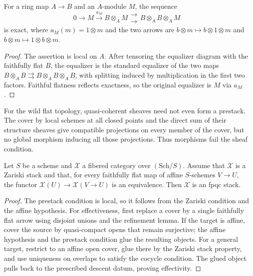 \begin{lemma}\label{fga-lem-4-22}
For a ring map $A\to B$ and an $A$-module $M$, the sequence
\[
0\longrightarrow M\xrightarrow{a_M}B\otimes_A M
 \mathrel{\substack{\longrightarrow\\[-.6ex]\longrightarrow}}
B\otimes_A B\otimes_A M\tag{4.22.1}
\]
is exact, where $a_M(m)=1\otimes m$ and the two arrows are
$b\otimes m\mapsto b\otimes1\otimes m$ and
$b\otimes m\mapsto1\otimes b\otimes m$.
\end{lemma}
\begin{proof}
The assertion is local on $A$.  After tensoring the equalizer diagram with the
faithfully flat $B$, the equalizer is the standard equalizer of the two maps
$B\otimes_A B\rightrightarrows B\otimes_A B\otimes_A B$, with splitting induced
by multiplication in the first two factors.  Faithful flatness reflects exactness,
so the original equalizer is $M$ via $a_M$.
\end{proof}

\begin{remark}\label{fga-rem-4-24}
For the wild flat topology, quasi-coherent sheaves need not even form a
prestack.  The cover by local schemes at all closed points and the direct sum of
their structure sheaves give compatible projections on every member of the cover,
but no global morphism inducing all those projections.  Thus morphisms fail the
sheaf condition.
\end{remark}

\begin{lemma}\label{fga-lem-4-25}
Let $S$ be a scheme and $\mathcal X$ a fibered category over $(\mathrm{Sch}/S)$.
Assume that $\mathcal X$ is a Zariski stack and that, for every faithfully flat
map of affine $S$-schemes $V\to U$, the functor
$\mathcal X(U)\to\mathcal X(V\to U)$ is an equivalence.  Then $\mathcal X$
is an fpqc stack.
\end{lemma}
\begin{proof}
The prestack condition is local, so it follows from the Zariski condition and
the affine hypothesis.  For effectiveness, first replace a cover by a single
faithfully flat arrow using disjoint unions and the refinement lemma.  If the
target is affine, cover the source by quasi-compact opens that remain surjective;
the affine hypothesis and the prestack condition glue the resulting objects.
For a general target, restrict to an affine open cover, glue there by the Zariski
stack property, and use uniqueness on overlaps to satisfy the cocycle condition.
The glued object pulls back to the prescribed descent datum, proving effectivity.
\end{proof}

